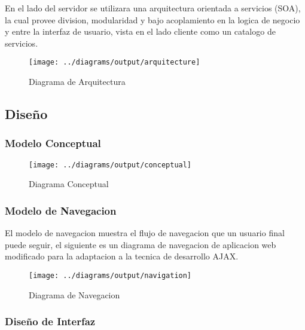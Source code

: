 En el lado del servidor se utilizara una arquitectura orientada a servicios (SOA), la cual provee division, modularidad y bajo acoplamiento en la logica de negocio y entre la interfaz de usuario, vista en el lado cliente como un catalogo de servicios.

\begin{landscape}
\begin{figure}
 \centering
 \texttt{[image: ../diagrams/output/arquitecture]}
 \caption{Diagrama de Arquitectura}
 \label{diagrama:arquitectura}
\end{figure}
\end{landscape}


\subsection{Diseño}

\subsubsection{Modelo Conceptual}

\begin{landscape}
\begin{figure}
 \centering
 \texttt{[image: ../diagrams/output/conceptual]}
 \caption{Diagrama Conceptual}
 \label{diagrama:conceptual}
\end{figure}
\end{landscape}


\subsubsection{Modelo de Navegacion}

El modelo de navegacion muestra el flujo de navegacion que un usuario final puede seguir, el siguiente es un diagrama de navegacion de aplicacion web modificado para la adaptacion a la tecnica de desarrollo AJAX.

\begin{landscape}
\begin{figure}
 \centering
 \texttt{[image: ../diagrams/output/navigation]}
 \caption{Diagrama de Navegacion}
 \label{diagrama:navegacion}
\end{figure}
\end{landscape}


\subsubsection{Diseño de Interfaz}

